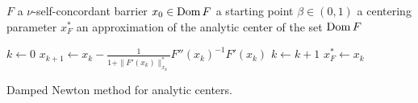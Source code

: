 \begin{algorithm}[ht]
  \begin{algorithmic}[1]
    \Require
      \Statex $F$ a $\nu$-self-concordant barrier
      \Statex $x_0 \in \operatorname{Dom} F$ a starting point
      \Statex $\beta \in (0,1)$ a centering parameter
    \Ensure
      \Statex $x^*_F$ an approximation of the analytic center of the set $\operatorname{Dom} F$
      \Statex

    \State $k \gets 0$
      \State $x_{k+1} \gets x_k - \frac{1}{1+\|F'(x_k)\|_{x_k}^*}F''(x_k)^{-1}F'(x_k)$
      \State $k \gets k + 1$
    \EndWhile
    \State \Return $x^*_F \gets x_k$

  \end{algorithmic}
  \caption{Damped Newton method for analytic centers. \cite[Scheme~4.2.25]{Nesterov-2004}}
\end{algorithm}
